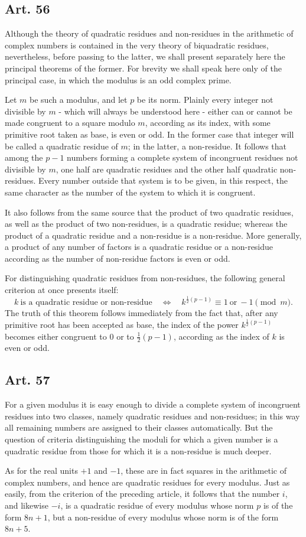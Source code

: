 \documentclass[12pt]{article}
\newcommand{\art}[1]{\subsection*{Art. #1}}
\begin{document}
\art{56}
Although the theory of quadratic residues and non-residues in the arithmetic of complex numbers is contained in the very theory of biquadratic residues, nevertheless, before passing to the latter, we shall present separately here the principal theorems of the former. For brevity we shall speak here only of the principal case, in which the modulus is an odd complex prime.

Let $m$ be such a modulus, and let $p$ be its norm. Plainly every integer not divisible by $m$ - which will always be understood here - either can or cannot be made congruent to a square modulo $m$, according as its index, with some primitive root taken as base, is even or odd. In the former case that integer will be called a quadratic residue of $m$; in the latter, a non-residue. It follows that among the $p-1$ numbers forming a complete system of incongruent residues not divisible by $m$, one half are quadratic residues and the other half quadratic non-residues. Every number outside that system is to be given, in this respect, the same character as the number of the system to which it is congruent.

It also follows from the same source that the product of two quadratic residues, as well as the product of two non-residues, is a quadratic residue; whereas the product of a quadratic residue and a non-residue is a non-residue. More generally, a product of any number of factors is a quadratic residue or a non-residue according as the number of non-residue factors is even or odd.

For distinguishing quadratic residues from non-residues, the following general criterion at once presents itself:
\[
 k\ \text{is a quadratic residue or non-residue}\quad
 \Longleftrightarrow\quad
 k^{\frac12(p-1)}\equiv 1\ \text{or}\ -1\pmod m.
\]
The truth of this theorem follows immediately from the fact that, after any primitive root has been accepted as base, the index of the power $k^{\frac12(p-1)}$ becomes either congruent to $0$ or to $\frac12(p-1)$, according as the index of $k$ is even or odd.

\art{57}
For a given modulus it is easy enough to divide a complete system of incongruent residues into two classes, namely quadratic residues and non-residues; in this way all remaining numbers are assigned to their classes automatically. But the question of criteria distinguishing the moduli for which a given number is a quadratic residue from those for which it is a non-residue is much deeper.

As for the real units $+1$ and $-1$, these are in fact squares in the arithmetic of complex numbers, and hence are quadratic residues for every modulus. Just as easily, from the criterion of the preceding article, it follows that the number $i$, and likewise $-i$, is a quadratic residue of every modulus whose norm $p$ is of the form $8n+1$, but a non-residue of every modulus whose norm is of the form $8n+5$.
\end{document}
